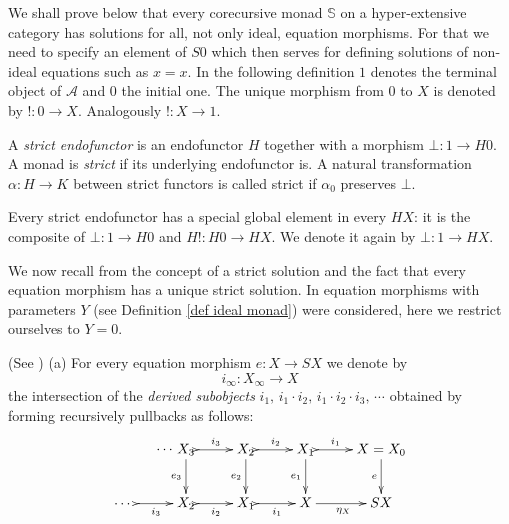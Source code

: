 \documentclass{LMCS}
\theoremstyle{plain}
\theoremstyle{definition}
\numberwithin{equation}{section}
\begin{document}
\begin{rem}
We shall prove below that every corecursive monad $\mathbb S$ on a hyper-extensive category has solutions for all, not only ideal, equation morphisms. For that we need to specify an element of $S0$ which then serves for defining solutions of non-ideal equations such as $x=x$. In the following definition $1$ denotes the terminal object of $\mathcal A$ and $0$ the initial one. The unique morphism from $0$ to $X$ is denoted by $!:0\rightarrow X$. Analogously $!:X\rightarrow 1$.
\end{rem}

\begin{defi}
A {\it strict endofunctor} is an endofunctor $H$ together with a morphism $\bot: 1\rightarrow H0$. A monad is {\it strict} if its underlying endofunctor is. A natural transformation $\alpha: H\rightarrow K$ between strict functors is called strict if $\alpha_0$ preserves $\bot$.

Every strict endofunctor has a special global element in every $HX$: it is the composite of $\bot:1\rightarrow H0$ and $H!:H0\rightarrow HX$. We denote it again by $\bot:1\rightarrow HX$.
\end{defi}

\begin{rem}
We now recall from \cite{abmv_how} the concept of a strict solution and the fact that every equation morphism has a unique strict solution. In \cite{abmv_how} equation morphisms with parameters $Y$ (see Definition \ref{def ideal monad}) were considered, here we restrict ourselves to $Y=0$.
\end{rem}


\begin{defi}{\rm (See \cite{abmv_how})}\label{def_derived subobjects}
(a) For every equation morphism $e:X\rightarrow SX$ we denote by $$i_\infty:X_\infty\rightarrow X$$
the intersection of the \emph{derived subobjects} $i_1,\, i_1\cdot i_2,\,i_1\cdot i_2\cdot i_3,\,\cdots$ obtained by forming recursively pullbacks as follows:
\begin{equation}\label{dia_derived subobjects}\vcenter{
\xymatrix{
\ar@{}[r]|(.65){\objectstyle \cdots}& X_3\ar[d]_{e_3}\ar@{>->}[r]^-{i_3}&{X_2}\ar[d]_{e_2}\ar@{>->}[r]^-{i_2}&{X_1}\ar[d]_{e_1}\ar@{>->}[r]^-{i_1}&X=X_0\ar[d]_{e}\\
{\textstyle\cdots}\ \ar@{>->}[r]_-{i_3}&X_{2}\ar@{>->}[r]_-{i_2}&X_{1}\ar@{>->}[r]_-{i_1}&X\ar[r]_{\eta_X}&SX
}
}
\end{equation}
\end{defi}
\end{document}
